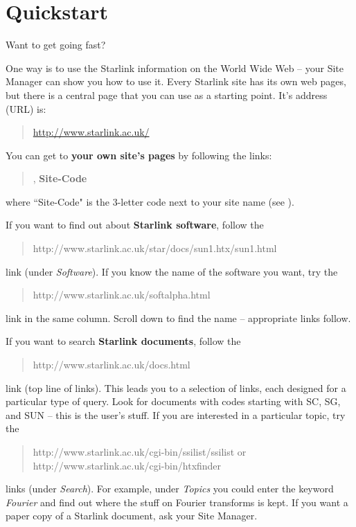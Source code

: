 \documentclass[twoside,11pt,nolof]{starlink}
\begin{document}
\scfrontmatter

\section{Quickstart}

Want to get going fast?

One way is to use the Starlink information on the World Wide Web -- your
Site Manager can show you how to use it.
Every Starlink site has its own web pages, but there is a central page that
you can use as a starting point.
It's address (URL) is:
\begin{quote}
\url{http://www.starlink.ac.uk/}
\end{quote}
You can get to \textbf{your own site's pages} by following the links:
\begin{quote}
,
\textbf{Site-Code}
\end{quote}
where ``Site-Code" is the 3-letter code next to your site name
(see ).

If you want to find out about \textbf{Starlink software}, follow the
\begin{quote}
{http://www.starlink.ac.uk/star/docs/sun1.htx/sun1.html}
\end{quote}
link (under \emph{Software}).
If you know the name of the software you want, try the
\begin{quote}
{http://www.starlink.ac.uk/softalpha.html}
\end{quote}
link in the same column.
Scroll down to find the name -- appropriate links follow.

If you want to search \textbf{Starlink documents}, follow the
\begin{quote}
{http://www.starlink.ac.uk/docs.html}
\end{quote}
link (top line of links).
This leads you to a selection of links, each designed for a particular type of
query.
Look for documents with codes starting with SC, SG, and SUN -- this is the
user's stuff.
If you are interested in a particular topic, try the
\begin{quote}
{http://www.starlink.ac.uk/cgi-bin/ssilist/ssilist} {\rm or}
{http://www.starlink.ac.uk/cgi-bin/htxfinder}
\end{quote}
links (under \emph{Search}).
For example, under \emph{Topics}\/ you could enter the keyword
\emph{Fourier}\/ and find out where the stuff on Fourier transforms is kept.
If you want a paper copy of a Starlink document, ask your Site Manager.
\end{document}
